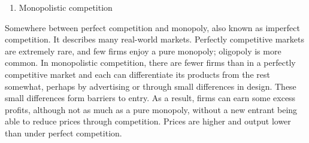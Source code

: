 \documentclass[11pt,]{book}
\providecommand{\tightlist}{%
  \setlength{\itemsep}{0pt}\setlength{\parskip}{0pt}}
\theoremstyle{definition}
\theoremstyle{definition}
\theoremstyle{definition}
\theoremstyle{remark}
\begin{document}
\begin{enumerate}
\def\labelenumi{\arabic{enumi}.}
\setcounter{enumi}{1}
\tightlist
\item
  Monopolistic competition
\end{enumerate}

Somewhere between perfect competition and monopoly, also known as
imperfect competition. It describes many real-world markets. Perfectly
competitive markets are extremely rare, and few firms enjoy a pure
monopoly; oligopoly is more common. In monopolistic competition, there
are fewer firms than in a perfectly competitive market and each can
differentiate its products from the rest somewhat, perhaps by
advertising or through small differences in design. These small
differences form barriers to entry. As a result, firms can earn some
excess profits, although not as much as a pure monopoly, without a new
entrant being able to reduce prices through competition. Prices are
higher and output lower than under perfect competition.
\end{document}
